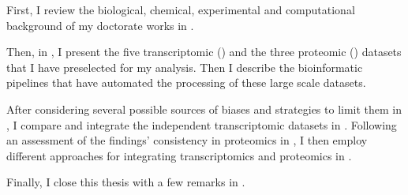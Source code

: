 First, I review the biological, chemical, experimental and computational
background of my doctorate works in .

Then, in ,
I present the five transcriptomic (\Rnaseq)
and the three proteomic () datasets
that I have preselected for my analysis.
Then I describe the bioinformatic pipelines
that have automated the processing of these large scale datasets.

After considering several possible sources of biases
and strategies to limit them in ,
I compare and integrate the independent transcriptomic datasets
in .
Following an assessment of the findings' consistency in proteomics
in ,
I then employ different approaches for integrating
transcriptomics and proteomics in .

Finally, I close this thesis with a few remarks in .

